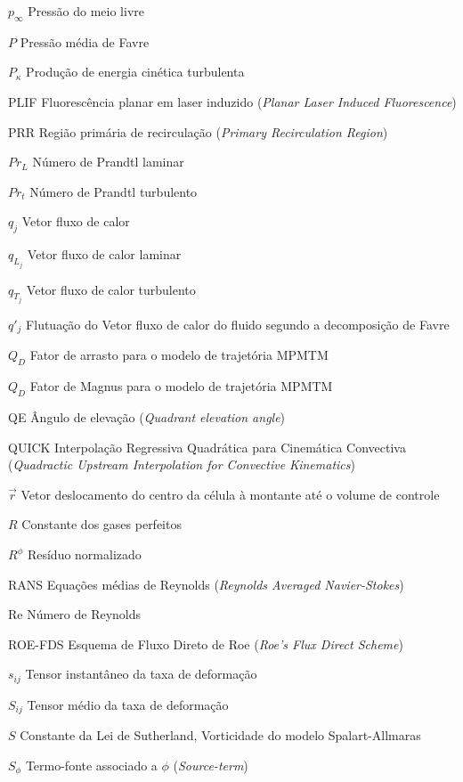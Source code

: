 \begin{siglas}
    \item[$p_\infty$] Pressão do meio livre
    \item[$P$] Pressão média de Favre
    \item[$P_{\kappa}$] Produção de energia cinética turbulenta
    \item[PLIF] Fluorescência planar em laser induzido (\textit{Planar Laser Induced Fluorescence})
    \item[PRR] Região primária de recirculação (\textit{Primary Recirculation Region})
    \item[$Pr_{L}$] Número de Prandtl laminar
    \item[$Pr_{t}$] Número de Prandtl turbulento
    \item[$q_j$] Vetor fluxo de calor
    \item[$q_{L_j}$] Vetor fluxo de calor laminar
    \item[$q_{T_j}$] Vetor fluxo de calor turbulento
    \item[$q'_j$] Flutuação do Vetor fluxo de calor do fluido segundo a decomposição de Favre
    \item[$Q_D$] Fator de arrasto para o modelo de trajetória MPMTM
    \item[$Q_D$] Fator de Magnus para o modelo de trajetória MPMTM
    \item[QE] Ângulo de elevação (\textit{Quadrant elevation angle})
    \item[QUICK] Interpolação Regressiva Quadrática para Cinemática Convectiva (\textit{Quadractic Upstream Interpolation for Convective Kinematics})
    \item[$\overrightarrow{r}$] Vetor deslocamento do centro da célula à montante até o volume de controle  
    \item[$R$] Constante dos gases perfeitos
    \item[$R^\phi$] Resíduo normalizado
    \item[RANS] Equações médias de Reynolds (\textit{Reynolds Averaged Navier-Stokes})
    \item[Re] Número de Reynolds
    \item[ROE-FDS] Esquema de Fluxo Direto de Roe (\textit{Roe's Flux Direct Scheme})
    \item[$s_{ij}$] Tensor instantâneo da taxa de deformação
    \item[$S_{ij}$] Tensor médio da taxa de deformação
    \item[$S$] Constante da Lei de Sutherland, Vorticidade do modelo Spalart-Allmaras
    \item[$S_{\phi}$] Termo-fonte associado a $\phi$ (\textit{Source-term})

\end{siglas}
